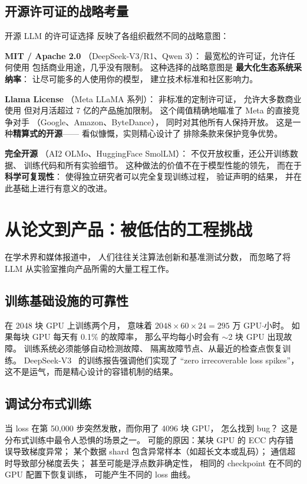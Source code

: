 \subsection{开源许可证的战略考量}

开源 LLM 的许可证选择
反映了各组织截然不同的战略意图：

\textbf{MIT / Apache 2.0}
（DeepSeek-V3/R1、Qwen 3）：
最宽松的许可证，允许任何使用
包括商业用途，几乎没有限制。
这种选择的战略意图是
\textbf{最大化生态系统采纳率}：
让尽可能多的人使用你的模型，
建立技术标准和社区影响力。

\textbf{Llama License}
（Meta LLaMA 系列）：
非标准的定制许可证，
允许大多数商业使用
但对月活超过 7 亿的产品施加限制。
这个阈值精确地瞄准了
Meta 的直接竞争对手
（Google、Amazon、ByteDance），
同时对其他所有人保持开放。
这是一种\textbf{精算式的开源}——
看似慷慨，实则精心设计了
排除条款来保护竞争优势。

\textbf{完全开源}
（AI2 OLMo、HuggingFace SmolLM）：
不仅开放权重，还公开训练数据、
训练代码和所有实验细节。
这种做法的价值不在于模型性能的领先，
而在于\textbf{科学可复现性}：
使得独立研究者可以完全复现训练过程，
验证声明的结果，
并在此基础上进行有意义的改进。

\section{从论文到产品：被低估的工程挑战}

在学术界和媒体报道中，
人们往往关注算法创新和基准测试分数，
而忽略了将 LLM 从实验室推向产品所需的大量工程工作。

\subsection{训练基础设施的可靠性}

在 2048 块 GPU 上训练两个月，
意味着 $2048 \times 60 \times 24 = 295$ 万 GPU$\cdot$小时。
如果每块 GPU 每天有 0.1\% 的故障率，
那么平均每小时会有 $\sim$2 块 GPU 出现故障。
训练系统必须能够自动检测故障、
隔离故障节点、从最近的检查点恢复训练。
DeepSeek-V3~\cite{deepseekv3} 的训练报告强调他们实现了
“zero irrecoverable loss spikes”，
这不是运气，而是精心设计的容错机制的结果。

\subsection{调试分布式训练}

当 loss 在第 50,000 步突然发散，而你用了 4096 块 GPU，
怎么找到 bug？
这是分布式训练中最令人恐惧的场景之一。
可能的原因：某块 GPU 的 ECC 内存错误导致梯度异常；
某个数据 shard 包含异常样本（如超长文本或乱码）；
通信超时导致部分梯度丢失；
甚至可能是浮点数非确定性，
相同的 checkpoint 在不同的 GPU 配置下恢复训练，
可能产生不同的 loss 曲线。

